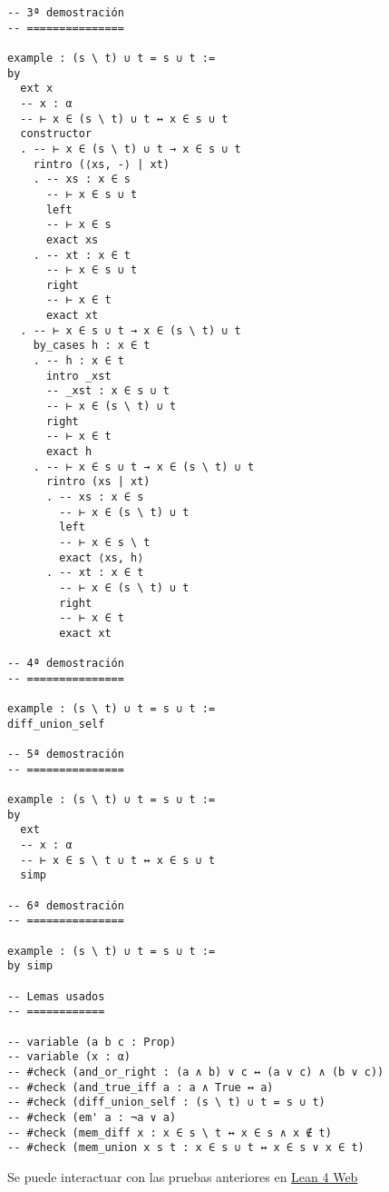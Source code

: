 \begin{verbatim}
-- 3ª demostración
-- ===============

example : (s \ t) ∪ t = s ∪ t :=
by
  ext x
  -- x : α
  -- ⊢ x ∈ (s \ t) ∪ t ↔ x ∈ s ∪ t
  constructor
  . -- ⊢ x ∈ (s \ t) ∪ t → x ∈ s ∪ t
    rintro (⟨xs, -⟩ | xt)
    . -- xs : x ∈ s
      -- ⊢ x ∈ s ∪ t
      left
      -- ⊢ x ∈ s
      exact xs
    . -- xt : x ∈ t
      -- ⊢ x ∈ s ∪ t
      right
      -- ⊢ x ∈ t
      exact xt
  . -- ⊢ x ∈ s ∪ t → x ∈ (s \ t) ∪ t
    by_cases h : x ∈ t
    . -- h : x ∈ t
      intro _xst
      -- _xst : x ∈ s ∪ t
      -- ⊢ x ∈ (s \ t) ∪ t
      right
      -- ⊢ x ∈ t
      exact h
    . -- ⊢ x ∈ s ∪ t → x ∈ (s \ t) ∪ t
      rintro (xs | xt)
      . -- xs : x ∈ s
        -- ⊢ x ∈ (s \ t) ∪ t
        left
        -- ⊢ x ∈ s \ t
        exact ⟨xs, h⟩
      . -- xt : x ∈ t
        -- ⊢ x ∈ (s \ t) ∪ t
        right
        -- ⊢ x ∈ t
        exact xt

-- 4ª demostración
-- ===============

example : (s \ t) ∪ t = s ∪ t :=
diff_union_self

-- 5ª demostración
-- ===============

example : (s \ t) ∪ t = s ∪ t :=
by
  ext
  -- x : α
  -- ⊢ x ∈ s \ t ∪ t ↔ x ∈ s ∪ t
  simp

-- 6ª demostración
-- ===============

example : (s \ t) ∪ t = s ∪ t :=
by simp

-- Lemas usados
-- ============

-- variable (a b c : Prop)
-- variable (x : α)
-- #check (and_or_right : (a ∧ b) ∨ c ↔ (a ∨ c) ∧ (b ∨ c))
-- #check (and_true_iff a : a ∧ True ↔ a)
-- #check (diff_union_self : (s \ t) ∪ t = s ∪ t)
-- #check (em' a : ¬a ∨ a)
-- #check (mem_diff x : x ∈ s \ t ↔ x ∈ s ∧ x ∉ t)
-- #check (mem_union x s t : x ∈ s ∪ t ↔ x ∈ s ∨ x ∈ t)
\end{verbatim}
Se puede interactuar con las pruebas anteriores en \href{https://lean.math.hhu.de/\#url=https://raw.githubusercontent.com/jaalonso/Calculemus2/main/src/Union\_con\_su\_diferencia.lean}{Lean 4 Web}

